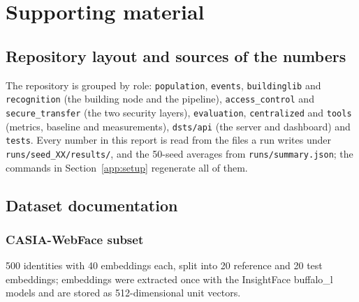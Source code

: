 \documentclass[12pt,a4paper,oneside]{report}
\begin{document}
\section{Supporting material}
\subsection{Repository layout and sources of the numbers}
The repository is grouped by role: \texttt{population}, \texttt{events}, \texttt{buildinglib} and \texttt{recognition} (the building node and the pipeline), \texttt{access\_\allowbreak control} and \texttt{secure\_\allowbreak transfer} (the two security layers), \texttt{evaluation}, \texttt{centralized} and \texttt{tools} (metrics, baseline and measurements), \texttt{dsts/api} (the server and dashboard) and \texttt{tests}. Every number in this report is read from the files a run writes under \texttt{runs/seed\_\allowbreak XX/results/}, and the 50-seed averages from \texttt{runs/summary.json}; the commands in Section~\ref{app:setup} regenerate all of them.

\subsection{Dataset documentation}
\subsubsection{CASIA-WebFace subset}500 identities with 40 embeddings each, split into 20 reference and 20 test embeddings; embeddings were extracted once with the InsightFace buffalo\_\allowbreak l models and are stored as 512-dimensional unit vectors.
\end{document}
